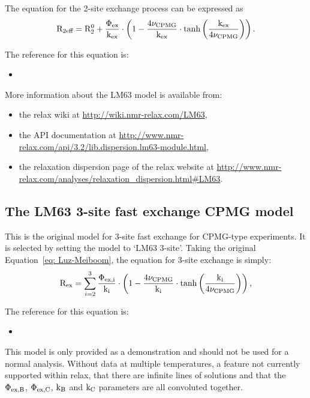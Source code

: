 The equation for the 2-site exchange process can be expressed as
\begin{equation}
    \mathrm{R}_{\textrm{2eff}} = \mathrm{R}_2^0 + \frac{\Phi_{\textrm{ex}}}{\textrm{k}_{\textrm{ex}}} \cdot \left( 1 - \frac{4\nu_{\textrm{CPMG}}}{\textrm{k}_{\textrm{ex}}} \cdot \tanh \left( \frac{\textrm{k}_{\textrm{ex}}}{4\nu_{\textrm{CPMG}}} \right) \right).
\end{equation}

The reference for this equation is:
\begin{itemize}
  \item {}
\end{itemize}

More information about the LM63 model is available from:
\begin{itemize}
  \item the relax wiki at \url{http://wiki.nmr-relax.com/LM63},
  \item the API documentation at \url{http://www.nmr-relax.com/api/3.2/lib.dispersion.lm63-module.html},
  \item the relaxation dispersion page of the relax website at \url{http://www.nmr-relax.com/analyses/relaxation\_dispersion.html#LM63}.
\end{itemize}



\subsection{The LM63 3-site fast exchange CPMG model}
\label{sect: dispersion: LM63 3-site model}

This is the original \citet{LuzMeiboom63} model for 3-site fast exchange for CPMG-type experiments.
It is selected by setting the model to `LM63 3-site'.
Taking the original Equation~\ref{eq: Luz-Meiboom}, the equation for 3-site exchange is simply:
\begin{equation}
    \mathrm{R}_{\textrm{ex}} = \sum_{i=2}^3 \frac{\Phi_{\textrm{ex,i}}}{\textrm{k}_{\textrm{i}}} \cdot \left( 1 - \frac{4\nu_{\textrm{CPMG}}}{\textrm{k}_{\textrm{i}}} \cdot \tanh \left( \frac{\textrm{k}_{\textrm{i}}}{4\nu_{\textrm{CPMG}}} \right) \right) ,
\end{equation}

The reference for this equation is:
\begin{itemize}
  \item {}
\end{itemize}

This model is only provided as a demonstration and should not be used for a normal analysis.
Without data at multiple temperatures, a feature not currently supported within relax, that there are infinite lines of solutions and that the $\Phi_{\textrm{ex,B}}$, $\Phi_{\textrm{ex,C}}$, $\textrm{k}_{\textrm{B}}$ and $\textrm{k}_{\textrm{C}}$ parameters are all convoluted together.

